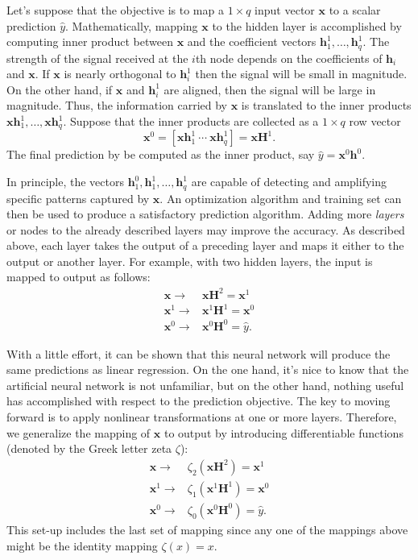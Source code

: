 \documentclass[graybox,envcountchap]{svmono}
\newcommand{\hf}{\mathbf{h}}
\newcommand{\Hf}{\mathbf{H}}
\newcommand{\xf}{\mathbf{x}}
\newcommand{\nn}{neural network}
\newcommand{\w}{\widehat}
\begin{document}
Let's suppose that the objective is to map a $1 \times q$ input vector $\xf$  to a scalar prediction $\w{y}$. Mathematically, mapping $\xf$ to the hidden layer is accomplished by computing inner product between $\xf$ and the coefficient vectors $\hf_1^1, \ldots, \hf_q^1$. The strength of the signal received at the $i$th node depends on the coefficients of $\hf_i$ and $\xf$.  If $\xf$ is nearly orthogonal to $\hf_i^1$ then the signal will be small in magnitude. On the other hand, if $\xf$ and $\hf_i^1$ are aligned, then the signal will be large in magnitude.  
Thus, the information carried by $\xf$ is translated to the inner products $\xf\hf_1^1,\ldots, \xf\hf_q^1$. Suppose that the inner products are collected as a $1 \times q$ row vector 
\begin{equation*}
 \xf^0 = [\xf\hf_1^1\ \cdots  \ \xf\hf_q^1] = \xf \Hf^1.
\end{equation*}
The final prediction by be computed as the inner product, say $\w{y} = {\xf^0} \mathbf{h}^0$. 

In principle, the vectors  $\hf_1^0, \hf_1^1, \ldots, \hf_q^1$ are capable of detecting and amplifying specific patterns captured by $\xf$. An optimization algorithm and training set can then be used to produce a satisfactory prediction algorithm. Adding more \emph{layers} or nodes to the already described layers may improve the accuracy.  As described above, each layer takes the output of a preceding layer and maps it either to the output or another layer. For example, with two hidden layers, the input is mapped to output as follows:
\begin{equation*}
\begin{align}
 \xf \rightarrow & \xf \Hf^2 = \xf^1\\
  \xf^1 \rightarrow &{\xf^1} \Hf^1 = \xf^0\\
   \xf^0 \rightarrow &{\xf^0} \Hf^0 = \w{y}.
\end{align}
\end{equation*}

With a little effort, it can be shown that this {\nn } will produce the same  predictions as linear regression. On the one hand, it's nice to know that the artificial neural network is not unfamiliar, but on the other hand, nothing useful has accomplished with respect to the prediction objective. The key to moving forward is to apply nonlinear transformations at one or more layers. Therefore, we generalize the mapping of $\xf$ to output by introducing differentiable functions (denoted by the Greek letter zeta $\zeta$):
\begin{equation*}
\begin{align}
 \xf \rightarrow & \zeta_2(\xf \Hf^2) = \xf^1\\
  \xf^1 \rightarrow & \zeta_1({\xf^1} \Hf^1) = \xf^0\\
   \xf^0 \rightarrow & \zeta_0({\xf^0} \Hf^0) = \w{y}.
\end{align}
\end{equation*}
This set-up includes the last set of mapping since any one of the mappings above might be the identity mapping $\zeta(x) = x$.
\end{document}
